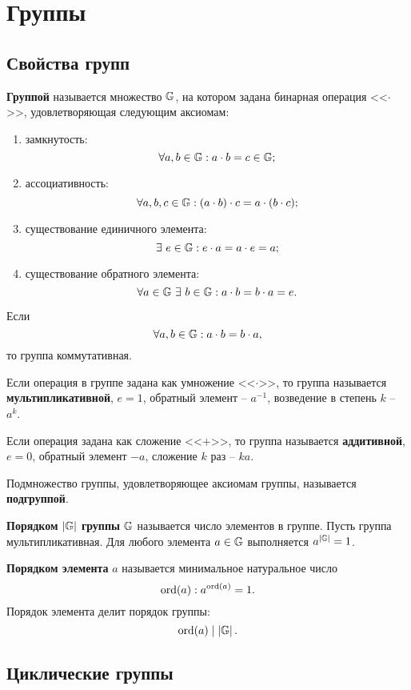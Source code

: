 \section{Группы}\label{section-groups}

\subsection{Свойства групп}

\textbf{Группой} называется множество $\mathbb{G}$, на котором задана бинарная операция <<$\cdot$>>, удовлетворяющая следующим аксиомам:
\begin{enumerate}
    \item замкнутость:
        \[ \forall a,b \in \mathbb{G}: a \cdot b = c \in \mathbb{G}; \]
    \item ассоциативность:
        \[ \forall a,b,c \in \mathbb{G}: (a \cdot b) \cdot c = a \cdot (b \cdot c); \]
    \item существование единичного элемента:
        \[ \exists ~ e \in \mathbb{G}: e\cdot a = a \cdot e = a; \]
    \item существование обратного элемента:
        \[ \forall a \in \mathbb{G} ~ \exists ~ b \in \mathbb{G}: a \cdot b = b \cdot a = e. \]
\end{enumerate}
Если
    \[ \forall a,b \in \mathbb{G}: a \cdot b = b \cdot a, \]
то группа коммутативная.

Если операция в группе задана как умножение <<$\cdot$>>, то группа называется \textbf{мультипликативной}, $e = 1$, обратный элемент -- $a^{-1}$, возведение в степень $k$ -- $a^k$.

Если операция задана как сложение <<$+$>>, то группа называется \textbf{аддитивной}, $e = 0$, обратный элемент $-a$, сложение $k$ раз -- $ka$.

Подмножество группы, удовлетворяющее аксиомам группы, называется \textbf{подгруппой}.

\textbf{Порядком} $|\mathbb{G}|$ \textbf{группы} $\mathbb{G}$ называется число элементов в группе. Пусть группа мультипликативная. Для любого элемента $a \in \mathbb{G}$ выполняется $a^{|\mathbb{G}|} = 1$.

\textbf{Порядком элемента} $a$ называется минимальное натуральное число
    \[ \operatorname{ord}(a): a^{\operatorname{ord}(a)} = 1. \]
 Порядок элемента делит порядок группы:
    \[ \operatorname{ord}(a) \mid \left|\mathbb{G}\right|. \]


\subsection{Циклические группы}

